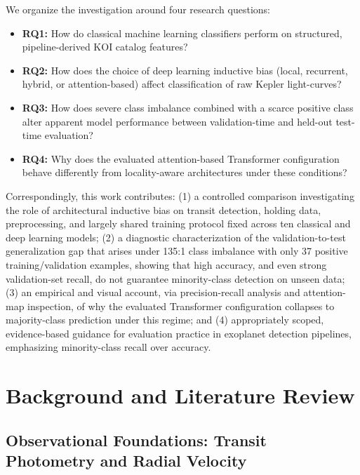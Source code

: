 \documentclass[preprint,11pt,times]{elsarticle}
\begin{document}
We organize the investigation around four research questions:
\begin{itemize}[leftmargin=1.6em]
\item \textbf{RQ1:} How do classical machine learning classifiers perform on structured, pipeline-derived KOI catalog features?
\item \textbf{RQ2:} How does the choice of deep learning inductive bias (local, recurrent, hybrid, or attention-based) affect classification of raw Kepler light-curves?
\item \textbf{RQ3:} How does severe class imbalance combined with a scarce positive class alter apparent model performance between validation-time and held-out test-time evaluation?
\item \textbf{RQ4:} Why does the evaluated attention-based Transformer configuration behave differently from locality-aware architectures under these conditions?
\end{itemize}

Correspondingly, this work contributes: (1) a controlled comparison investigating the role of architectural inductive bias on transit detection, holding data, preprocessing, and largely shared training protocol fixed across ten classical and deep learning models; (2) a diagnostic characterization of the validation-to-test generalization gap that arises under 135:1 class imbalance with only 37 positive training/validation examples, showing that high accuracy, and even strong validation-set recall, do not guarantee minority-class detection on unseen data; (3) an empirical and visual account, via precision-recall analysis and attention-map inspection, of why the evaluated Transformer configuration collapses to majority-class prediction under this regime; and (4) appropriately scoped, evidence-based guidance for evaluation practice in exoplanet detection pipelines, emphasizing minority-class recall over accuracy.

\section{Background and Literature Review}\label{sec2}

\subsection{Observational Foundations: Transit Photometry and Radial Velocity}\label{subsec2a}
\end{document}
